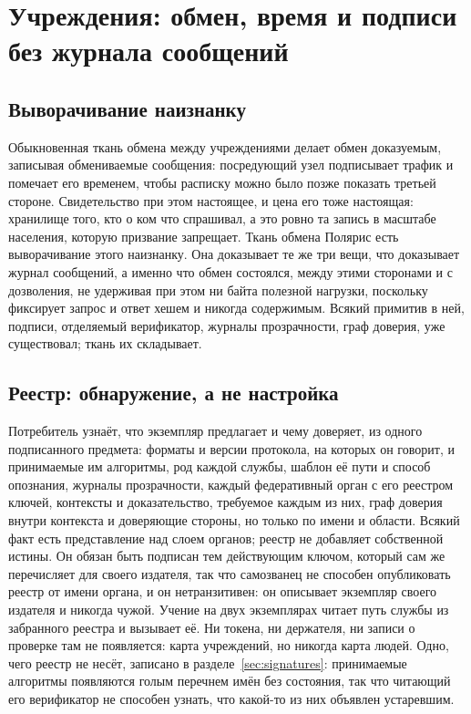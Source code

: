 \section{Учреждения: обмен, время и подписи без журнала сообщений}
\label{sec:institutions}



\subsection{Выворачивание наизнанку}

Обыкновенная ткань обмена между учреждениями делает обмен доказуемым, записывая обмениваемые
сообщения: посредующий узел подписывает трафик и помечает его временем, чтобы расписку можно было
позже показать третьей стороне. Свидетельство при этом настоящее, и цена его тоже настоящая:
хранилище того, кто о ком что спрашивал, а это ровно та запись в масштабе населения, которую
призвание запрещает. Ткань обмена Полярис есть выворачивание этого наизнанку. Она доказывает те же
три вещи, что доказывает журнал сообщений, а именно что обмен состоялся, между этими сторонами и с
дозволения, не удерживая при этом ни байта полезной нагрузки, поскольку фиксирует запрос и ответ
хешем и никогда содержимым. Всякий примитив в ней, подписи, отделяемый верификатор, журналы
прозрачности, граф доверия, уже существовал; ткань их складывает. \sImpl

\subsection{Реестр: обнаружение, а не настройка}

Потребитель узнаёт, что экземпляр предлагает и чему доверяет, из одного подписанного предмета:
форматы и версии протокола, на которых он говорит, и принимаемые им алгоритмы, род каждой службы,
шаблон её пути и способ опознания, журналы прозрачности, каждый федеративный орган с его реестром
ключей, контексты и доказательство, требуемое каждым из них, граф доверия внутри контекста и
доверяющие стороны, но только по имени и области. Всякий факт есть представление над слоем органов;
реестр не добавляет собственной истины. Он обязан быть подписан тем действующим ключом, который сам
же перечисляет для своего издателя, так что самозванец не способен опубликовать реестр от имени
органа, и он нетранзитивен: он описывает экземпляр своего издателя и никогда чужой. Учение на двух
экземплярах читает путь службы из забранного реестра и вызывает её. Ни токена, ни держателя, ни
записи о проверке там не появляется: карта учреждений, но никогда карта людей. Одно, чего реестр не
несёт, записано в разделе~\ref{sec:signatures}: принимаемые алгоритмы появляются голым перечнем
имён без состояния, так что читающий его верификатор не способен узнать, что какой-то из них
объявлен устаревшим. \sImpl

